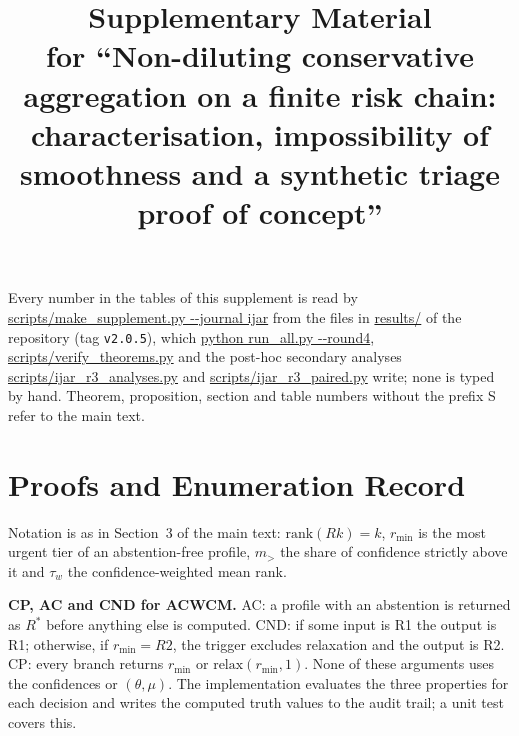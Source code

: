 \documentclass[11pt,a4paper]{article}%
\begin{document}
\title{Supplementary Material\\[2pt] \large for ``Non-diluting conservative aggregation on a finite risk chain: characterisation, impossibility of smoothness and a synthetic triage proof of concept''}
\author{}
\date{}
\maketitle

Every number in the tables of this supplement is read by \url{scripts/make_supplement.py --journal ijar} from the files in \url{results/} of the repository (tag \texttt{v2.0.5}), which \url{python run_all.py --round4}, \url{scripts/verify_theorems.py} and the post-hoc secondary analyses \url{scripts/ijar_r3_analyses.py} and \url{scripts/ijar_r3_paired.py} write; none is typed by hand. Theorem, proposition, section and table numbers without the prefix S refer to the main text.

\section{Proofs and Enumeration Record}\label{sup:proofs}

Notation is as in Section~3 of the main text: $\text{rank}(Rk)=k$, $r_{\min}$ is the most urgent tier of an abstention-free profile, $m_>$ the share of confidence strictly above it and $\tau_w$ the confidence-weighted mean rank.

\textbf{CP, AC and CND for ACWCM.} AC: a profile with an abstention is returned as $R^*$ before anything else is computed. CND: if some input is R1 the output is R1; otherwise, if $r_{\min}=R2$, the trigger excludes relaxation and the output is R2. CP: every branch returns $r_{\min}$ or $\text{relax}(r_{\min},1)$. None of these arguments uses the confidences or $(\theta,\mu)$. The implementation evaluates the three properties for each decision and writes the computed truth values to the audit trail; a unit test covers this.
\end{document}
